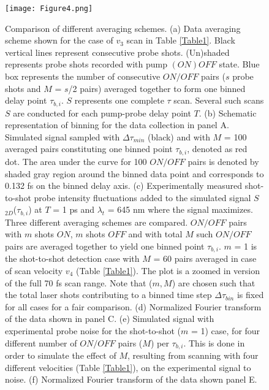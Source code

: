 \documentclass[%
aip,
amsmath,amssymb,
preprint,%
]{revtex4-2}
\begin{document}
\begin{figure}[hbt!]
\centering\texttt{[image: Figure4.png]}
\caption{Comparison of different averaging schemes. (a) Data averaging scheme shown for the case of $v$$_3$ scan in Table \ref{Table1}.  Black vertical lines represent consecutive probe shots. (Un)shaded represents probe shots recorded with pump $(ON)OFF$ state. Blue box represents the number of consecutive $ON/OFF$ pairs ($s$ probe shots and $M$ = $s$/2 pairs) averaged together to form one binned delay point $\tau_{b,i}$. $S$ represents one complete $\tau$ scan. Several such scans $S$ are conducted for each pump-probe delay point $T$. (b) Schematic representation of binning for the data collection in panel A. Simulated signal sampled with $\Delta\tau_{min}$ (black) and with $M$ = 100 averaged pairs constituting one binned point $\tau_{b,i}$, denoted as red dot. The area under the curve for 100 $ON/OFF$ pairs is denoted by shaded gray region around the binned data point and corresponds to 0.132 fs on the binned delay axis. (c) Experimentally measured shot-to-shot probe intensity fluctuations added to the simulated signal $S$$_{2D}$($\tau_{b,i}$) at $T$ = 1 ps and $\lambda_t$ = 645 nm where the signal maximizes. Three different averaging schemes are compared. $ON/OFF$ pairs with $m$ shots $ON$, $m$ shots $OFF$ and with total $M$ such $ON/OFF$ pairs are averaged together to yield one binned point $\tau_{b,i}$. $m$ = 1 is the shot-to-shot detection case with $M$ = 60 pairs averaged in case of scan velocity $v_4$ (Table \ref{Table1}). The plot is a zoomed in version of the full 70 fs scan range. Note that ($m,M$) are chosen such that the total laser shots contributing to a binned time step $\Delta\tau_{bin}$ is fixed for all cases for a fair comparison. (d) Normalized Fourier transform of the data shown in panel C. (e) Simulated signal with experimental probe noise for the shot-to-shot ($m$ = 1) case, for four different number of $ON/OFF$ pairs ($M$) per $\tau_{b,i}$. This is done in order to simulate the effect of $M$, resulting from scanning with four different velocities (Table \ref{Table1}), on the experimental signal to noise.  (f) Normalized Fourier transform of the data shown panel E.}
\label{fig:fig4}
\end{figure}

\end{document}
